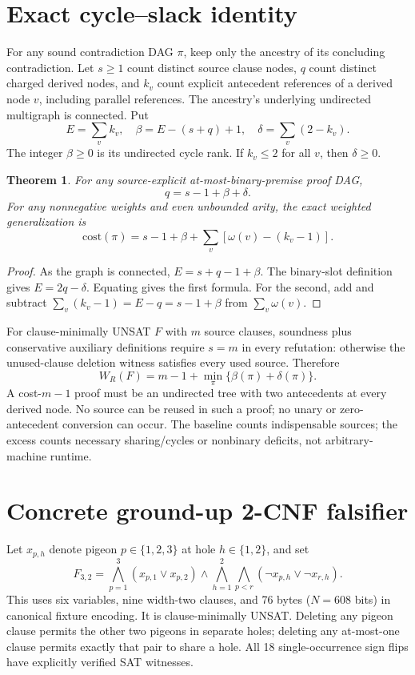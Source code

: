 \documentclass[11pt]{article}
\newtheorem{theorem}{Theorem}
\begin{document}
\section{Exact cycle--slack identity}
For any sound contradiction DAG $\pi$, keep only the ancestry of its concluding contradiction. Let $s\ge1$ count distinct source clause nodes, $q$ count distinct charged derived nodes, and $k_v$ count explicit antecedent references of a derived node $v$, including parallel references. The ancestry's underlying undirected multigraph is connected. Put
\[
E=\sum_v k_v,\quad \beta=E-(s+q)+1,\quad \delta=\sum_v(2-k_v).
\]
The integer $\beta\ge0$ is its undirected cycle rank. If $k_v\le2$ for all $v$, then $\delta\ge0$.
\begin{theorem}
For any source-explicit at-most-binary-premise proof DAG,
\[
\boxed{q=s-1+\beta+\delta.}
\]
For any nonnegative weights and even unbounded arity, the exact weighted generalization is
\[
\boxed{\mathrm{cost}(\pi)=s-1+\beta+\sum_v\left[\omega(v)-(k_v-1)\right].}
\]
\end{theorem}
\begin{proof}
As the graph is connected, $E=s+q-1+\beta$. The binary-slot definition gives $E=2q-\delta$. Equating gives the first formula. For the second, add and subtract $\sum_v(k_v-1)=E-q=s-1+\beta$ from $\sum_v\omega(v)$.
\end{proof}
For clause-minimally UNSAT $F$ with $m$ source clauses, soundness plus conservative auxiliary definitions require $s=m$ in every refutation: otherwise the unused-clause deletion witness satisfies every used source. Therefore
\[
W_R(F)=m-1+\min_{\pi}\{\beta(\pi)+\delta(\pi)\}.
\]
A cost-$m-1$ proof must be an undirected tree with two antecedents at every derived node. No source can be reused in such a proof; no unary or zero-antecedent conversion can occur. The baseline counts indispensable sources; the excess counts necessary sharing/cycles or nonbinary deficits, not arbitrary-machine runtime.

\section{Concrete ground-up 2-CNF falsifier}
Let $x_{p,h}$ denote pigeon $p\in\{1,2,3\}$ at hole $h\in\{1,2\}$, and set
\[
F_{3,2}=\bigwedge_{p=1}^3(x_{p,1}\vee x_{p,2})
\wedge\bigwedge_{h=1}^2\bigwedge_{p<r}(\neg x_{p,h}\vee\neg x_{r,h}).
\]
This uses six variables, nine width-two clauses, and 76 bytes ($N=608$ bits) in canonical fixture encoding. It is clause-minimally UNSAT. Deleting any pigeon clause permits the other two pigeons in separate holes; deleting any at-most-one clause permits exactly that pair to share a hole. All 18 single-occurrence sign flips have explicitly verified SAT witnesses.
\end{document}
